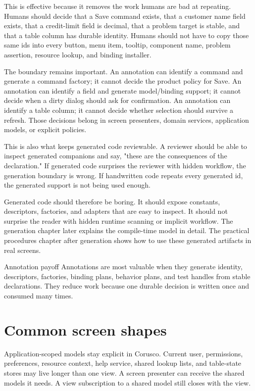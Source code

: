 This is effective because it removes the work humans are bad at repeating. Humans should decide that a Save command exists, that a customer name field exists, that a credit-limit field is decimal, that a problem target is stable, and that a table column has durable identity. Humans should not have to copy those same ids into every button, menu item, tooltip, component name, problem assertion, resource lookup, and binding installer.

The boundary remains important. An annotation can identify a command and generate a command factory; it cannot decide the product policy for Save. An annotation can identify a field and generate model/binding support; it cannot decide when a dirty dialog should ask for confirmation. An annotation can identify a table column; it cannot decide whether selection should survive a refresh. Those decisions belong in screen presenters, domain services, application models, or explicit policies.

This is also what keeps generated code reviewable. A reviewer should be able to inspect generated companions and say, "these are the consequences of the declaration." If generated code surprises the reviewer with hidden workflow, the generation boundary is wrong. If handwritten code repeats every generated id, the generated support is not being used enough.

Generated code should therefore be boring. It should expose constants, descriptors, factories, and adapters that are easy to inspect. It should not surprise the reader with hidden runtime scanning or implicit workflow. The generation chapter later explains the compile-time model in detail. The practical procedures chapter after generation shows how to use these generated artifacts in real screens.

\begin{coruscobox}{Annotation payoff}
Annotations are most valuable when they generate identity, descriptors, factories, binding plans, behavior plans, and test handles from stable declarations. They reduce work because one durable decision is written once and consumed many times.
\end{coruscobox}

\section{Common screen shapes}

Application-scoped models stay explicit in Corusco. Current user, permissions, preferences, resource context, help service, shared lookup lists, and table-state stores may live longer than one view. A screen presenter can receive the shared models it needs. A view subscription to a shared model still closes with the view.

